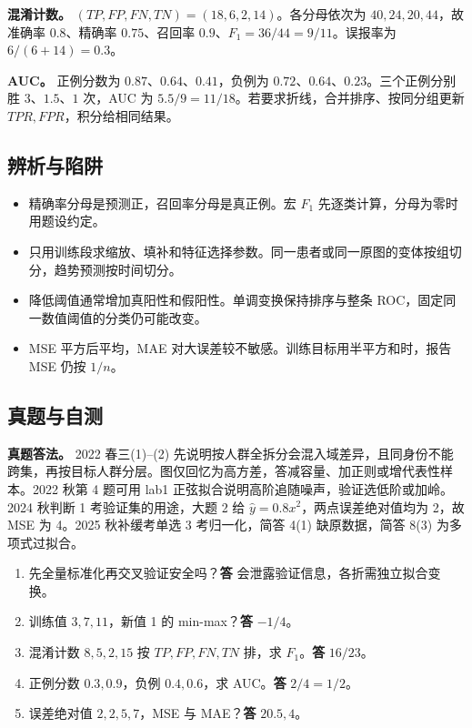 \documentclass[UTF8,a4paper,zihao=-4,fontset=fandol]{ctexart}
\begin{document}
\textbf{混淆计数。} \((TP,FP,FN,TN)=(18,6,2,14)\)。各分母依次为 \(40,24,20,44\)，故准确率 \(0.8\)、精确率 \(0.75\)、召回率 \(0.9\)、\(F_1=36/44=9/11\)。误报率为 \(6/(6+14)=0.3\)。
 
\textbf{AUC。} 正例分数为 \(0.87\)、\(0.64\)、\(0.41\)，负例为 \(0.72\)、\(0.64\)、\(0.23\)。三个正例分别胜 \(3\)、\(1.5\)、\(1\) 次，AUC 为 \(5.5/9=11/18\)。若要求折线，合并排序、按同分组更新 \(TPR,FPR\)，积分给相同结果。

\subsection{辨析与陷阱}
\begin{itemize}[nosep,leftmargin=*]
\item 精确率分母是预测正，召回率分母是真正例。宏 \(F_1\) 先逐类计算，分母为零时用题设约定。
\item 只用训练段求缩放、填补和特征选择参数。同一患者或同一原图的变体按组切分，趋势预测按时间切分。
\item 降低阈值通常增加真阳性和假阳性。单调变换保持排序与整条 ROC，固定同一数值阈值的分类仍可能改变。
\item MSE 平方后平均，MAE 对大误差较不敏感。训练目标用半平方和时，报告 MSE 仍按 \(1/n\)。
\end{itemize}

\subsection{真题与自测}
\textbf{真题答法。} 2022 春三(1)--(2) 先说明按人群全拆分会混入域差异，且同身份不能跨集，再按目标人群分层。图仅回忆为高方差，答减容量、加正则或增代表性样本。2022 秋第 4 题可用 lab1 正弦拟合说明高阶追随噪声，验证选低阶或加岭。2024 秋判断 1 考验证集的用途，大题 2 给 \(\hat y=0.8x^2\)，两点误差绝对值均为 2，故 MSE 为 4。2025 秋补缓考单选 3 考归一化，简答 4(1) 缺原数据，简答 8(3) 为多项式过拟合。
\begin{enumerate}[nosep,leftmargin=*]
\item 先全量标准化再交叉验证安全吗？\textbf{答} 会泄露验证信息，各折需独立拟合变换。
\item 训练值 \(3,7,11\)，新值 1 的 min-max？\textbf{答} \(-1/4\)。
\item 混淆计数 \(8,5,2,15\) 按 \(TP,FP,FN,TN\) 排，求 \(F_1\)。\textbf{答} \(16/23\)。
\item 正例分数 \(0.3,0.9\)，负例 \(0.4,0.6\)，求 AUC。\textbf{答} \(2/4=1/2\)。
\item 误差绝对值 \(2,2,5,7\)，MSE 与 MAE？\textbf{答} \(20.5,4\)。
\end{enumerate}
\end{document}
